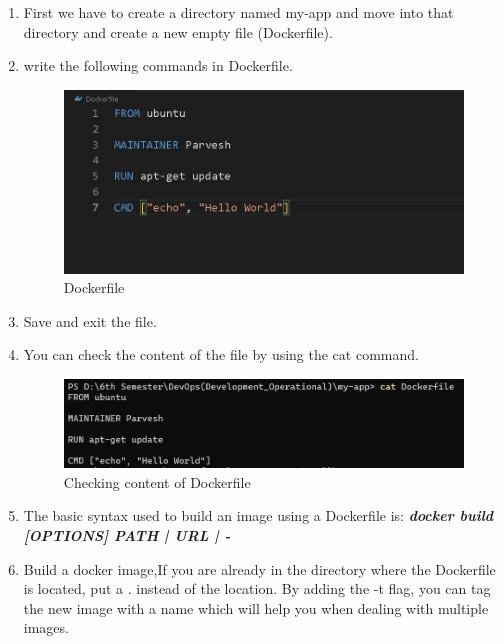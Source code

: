 \documentclass[12pt]{article}
\begin{document}
\begin{enumerate}
\item First we have to create a directory named my-app and move into that directory and create a new empty file (Dockerfile).

\item write the following commands in Dockerfile.

\begin{figure}[H]
\centering
\includegraphics[scale=0.7]{fig34}
\caption{Dockerfile}
\vspace{0.6\baselineskip}
\end{figure}	

\item Save and exit the file.

\item You can check the content of the file by using the cat command.

\begin{figure}[H]
\centering
\includegraphics[scale=0.7]{fig35}
\caption{Checking content of Dockerfile}
\vspace{0.6\baselineskip}
\end{figure}	

\item The basic syntax used to build an image using a Dockerfile is: \textbf{\textit{docker build [OPTIONS] PATH | URL | -}}

\item Build a docker image,If you are already in the directory where the Dockerfile is located, put a . instead of the location. By adding the -t flag, you can tag the new image with a name which will help you when dealing with multiple images.


\end{enumerate}
\end{document}
